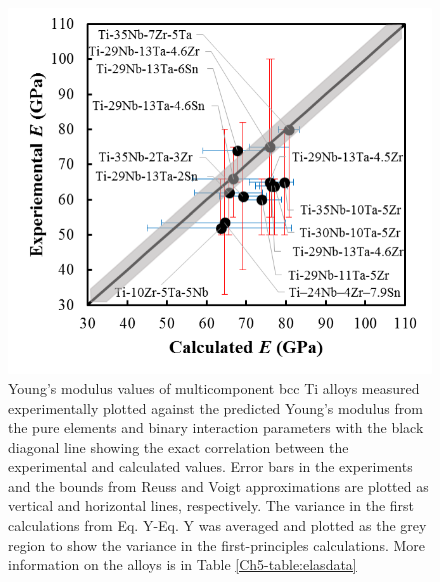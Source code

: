 \pagebreak
\begin{figure}[H]
	\centering
	\includegraphics[width=\textwidth]{Chapter-5/Figures/edatabase.png}
	\caption{Young's modulus values of multicomponent bcc Ti alloys measured experimentally plotted against the predicted Young's modulus from the pure elements and binary interaction parameters with the black diagonal line showing the exact correlation between the experimental and calculated values. Error bars in the experiments and the bounds from Reuss and Voigt approximations are plotted as vertical and horizontal lines, respectively. The variance in the first calculations from Eq. Y-Eq. Y was averaged and plotted as the grey region to show the variance in the first-principles calculations. More information on the alloys is in Table \ref{Ch5-table:elasdata} \cite{Tane2010a,Geetha2009,Mohammed2014}}
	\label{Ch5-figure:tixdatabase}
\end{figure}